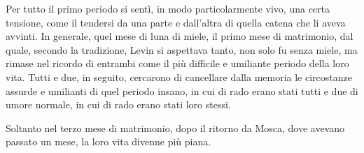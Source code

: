 Per tutto il primo periodo si sentì, in modo particolarmente vivo, una certa tensione, come il tendersi da una parte e dall'altra di quella catena che li aveva avvinti. In generale, quel mese di luna di miele, il primo mese di matrimonio, dal quale, secondo la tradizione, Levin si aspettava tanto, non solo fu senza miele, ma rimase nel ricordo di entrambi come il più difficile e umiliante periodo della loro vita. Tutti e due, in seguito, cercarono di cancellare dalla memoria le circostanze assurde e umilianti di quel periodo insano, in cui di rado erano stati tutti e due di umore normale, in cui di rado erano stati loro stessi. 

Soltanto nel terzo mese di matrimonio, dopo il ritorno da Mosca, dove avevano passato un mese, la loro vita divenne più piana. 

\label{xv-4} 

